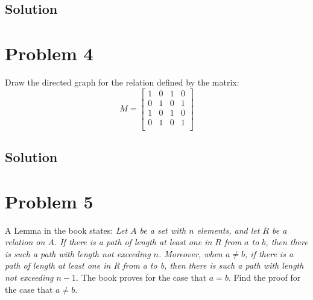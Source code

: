 \documentclass[article, 12pt]{article}
\theoremstyle{definition}
\begin{document}
    \subsection*{Solution}
    \pagebreak
    \section*{Problem 4}
    Draw the directed graph for the relation defined by the matrix:
    \[ M = \begin{bmatrix}
        1 & 0 & 1 & 0 \\
        0 & 1 & 0 & 1 \\
        1 & 0 & 1 & 0 \\
        0 & 1 & 0 & 1 \\
    \end{bmatrix} \]
    \subsection*{Solution}
    \begin{figure}[H]
        \centering
    \end{figure}
    \pagebreak
    \section*{Problem 5}
    A Lemma in the book states: {\em Let $A$ be a set with $n$ elements, and let $R$ be a relation on $A$. If there is a path of length at least one in $R$ from $a$ to $b$, then there is such a path with length not exceeding $n$. Moreover, when $a \neq b$, if there is a path of length at least one in R from a to b, then there is such a path with length not exceeding $n-1$}. The book proves for the case that $a=b$. Find the proof for the case that $a \neq b$.
\end{document}
